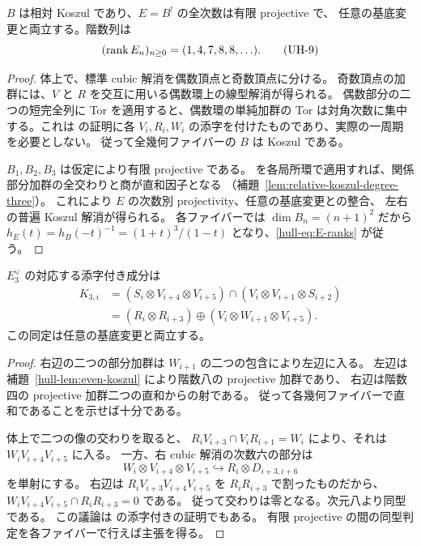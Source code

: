 \begin{lemma}
\label{hull-lem:even-koszul}
$B$ は相対 Koszul であり、$E=B^!$ の全次数は有限 projective で、
任意の基底変更と両立する。階数列は
\[
 (\operatorname{rank} E_n)_{n\ge0}=(1,4,7,8,8,\ldots).
 \tag{UH-9}\label{hull-eq:E-ranks}
\]
\end{lemma}
\begin{proof}
体上で、標準 cubic 解消を偶数頂点と奇数頂点に分ける。
奇数頂点の加群には、$V$ と $R$ を交互に用いる偶数環上の線型解消が得られる。
偶数部分の二つの短完全列に Tor を適用すると、偶数環の単純加群の
Tor は対角次数に集中する。これは \cite[Proposition 2.1]{BauwensVanDenBergh1998}
の証明に各 $V_i,R_i,W_i$ の添字を付けたものであり、実際の一周期を必要としない。
従って全幾何ファイバーの $B$ は Koszul である。

$B_1,B_2,B_3$ は仮定により有限 projective である。
\cite[Chapter 6, Theorem 7.3, Propositions 7.1--7.2]{PolishchukPositselski2005}
を各局所環で適用すれば、関係部分加群の全交わりと商が直和因子となる
（補題~\ref{lem:relative-koszul-degree-three}）。
これにより $E$ の次数別 projectivity、任意の基底変更との整合、
左右の普遍 Koszul 解消が得られる。
各ファイバーでは $\dim B_n=(n+1)^2$ だから
$h_E(t)=h_B(-t)^{-1}=(1+t)^3/(1-t)$ となり、\eqref{hull-eq:E-ranks} が従う。
\end{proof}

\begin{lemma}[普遍的な次数三分解]
\label{hull-lem:K3}
$E_3^{\vee}$ の対応する添字付き成分は
\begin{align*}
 K_{3,i}
 &= (S_i\otimes V_{i+4}\otimes V_{i+5})
       \cap(V_i\otimes V_{i+1}\otimes S_{i+2})\\
 &= (R_i\otimes R_{i+3})
       \oplus(V_i\otimes W_{i+1}\otimes V_{i+5}).
 \tag{UH-10}\label{hull-eq:K3}
\end{align*}
この同定は任意の基底変更と両立する。
\end{lemma}
\begin{proof}
右辺の二つの部分加群は $W_{i+1}$ の二つの包含により左辺に入る。
左辺は補題~\ref{hull-lem:even-koszul} により階数八の projective 加群であり、
右辺は階数四の projective 加群二つの直和からの射である。
従って各幾何ファイバーで直和であることを示せば十分である。

体上で二つの像の交わりを取ると、
$R_iV_{i+3}\cap V_iR_{i+1}=W_i$ により、それは
$W_iV_{i+4}V_{i+5}$ に入る。
一方、右 cubic 解消の次数六の部分は
\[
 W_i\otimes V_{i+4}\otimes V_{i+5}
 \hookrightarrow R_i\otimes D_{i+3,i+6}
\]
を単射にする。
右辺は $R_iV_{i+3}V_{i+4}V_{i+5}$ を $R_iR_{i+3}$ で割ったものだから、
$W_iV_{i+4}V_{i+5}\cap R_iR_{i+3}=0$ である。
従って交わりは零となる。次元八より同型である。
この議論は \cite[(2.7), Lemmas 2.3--2.4]{BauwensVanDenBergh1998} の添字付きの証明でもある。
有限 projective の間の同型判定を各ファイバーで行えば主張を得る。
\end{proof}

